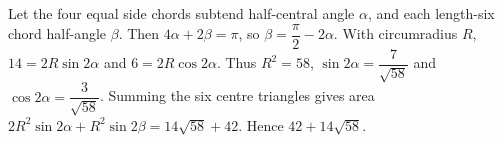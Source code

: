 Let the four equal side chords subtend half-central angle $\alpha$, and each length-six chord half-angle $\beta$. Then $4\alpha+2\beta=\pi$, so $\beta=\dfrac{\pi}{2}-2\alpha$. With circumradius $R$, $14=2R\sin2\alpha$ and $6=2R\cos2\alpha$. Thus $R^2=58$, $\sin2\alpha=\dfrac{7}{\sqrt{58}}$ and $\cos2\alpha=\dfrac{3}{\sqrt{58}}$. Summing the six centre triangles gives area $2R^2\sin2\alpha+R^2\sin2\beta=14\sqrt{58}+42$. Hence $\boxed{42+14\sqrt{58}}$.

